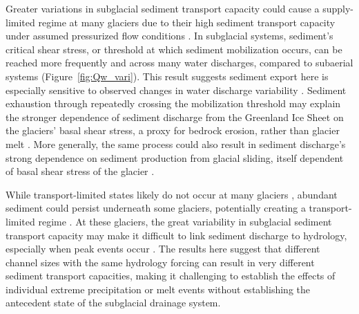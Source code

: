 \documentclass[tc, manuscript]{copernicus}
\begin{document}
Greater variations in subglacial sediment transport capacity could cause a supply-limited regime at many glaciers due to their high sediment transport capacity under assumed pressurized flow conditions \citep{alley1997}.
In subglacial systems, sediment's critical shear stress, or threshold at which sediment mobilization occurs, can be reached more frequently and across many water discharges, compared to subaerial systems (Figure~\ref{fig:Qw_vari}).
This result suggests sediment export here is especially sensitive to observed changes in water discharge variability \citep{lane2019b}.
Sediment exhaustion through repeatedly crossing the mobilization threshold may explain the stronger dependence of sediment discharge from the Greenland Ice Sheet on the glaciers' basal shear stress, a proxy for bedrock erosion, rather than glacier melt \citep{overeem2017}.
More generally, the same process could also result in sediment discharge's strong dependence on sediment production from glacial sliding, itself dependent of basal shear stress of the glacier \citep{herman2015,koppes2015}.

While transport-limited states likely do not occur at many glaciers \citep[e.g.][]{alley1997}, abundant sediment could persist underneath some glaciers, potentially creating a transport-limited regime \citep[e.g.][]{walter2014,stevens2022,delaney2022}.
At these glaciers, the great variability in subglacial sediment transport capacity may make it difficult to link sediment discharge to hydrology, especially when peak events occur \citep{cowan1988,delaney2018,lu2022}.
The results here suggest that different channel sizes with the same hydrology forcing can result in very different sediment transport capacities, making it challenging to establish the effects of individual extreme precipitation or melt events without establishing the antecedent state of the subglacial drainage system.
\end{document}
